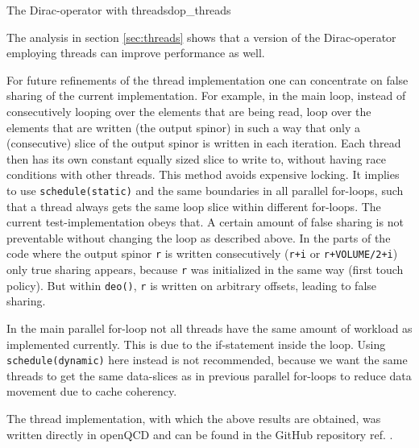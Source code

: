 \documentclass{article}
\theoremstyle{plain} %
\theoremstyle{convention} %
\theoremstyle{remark} %
\def\code#1{\texttt{#1}}
\numberwithin{equation}{section}
\begin{document}
\begin{proposal}{The Dirac-operator with threads}{dop_threads}

The analysis in section \ref{sec:threads} shows that a version of the Dirac-operator employing threads can improve performance as well.

For future refinements of the thread implementation one can concentrate on false sharing of the current implementation. For example, in the main loop, instead of consecutively looping over the elements that are being read, loop over the elements that are written (the output spinor) in such a way that only a (consecutive) slice of the output spinor is written in each iteration. Each thread then has its own constant equally sized slice to write to, without having race conditions with other threads. This method avoids expensive locking. It implies to use \code{schedule(static)} and the same boundaries in all parallel for-loops, such that a thread always gets the same loop slice within different for-loops. The current test-implementation obeys that. A certain amount of false sharing is not preventable without changing the loop as described above. In the parts of the code where the output spinor \code{r} is written consecutively (\code{r+i} or \code{r+VOLUME/2+i}) only true sharing appears, because \code{r} was initialized in the same way (first touch policy). But within \code{deo()}, \code{r} is written on arbitrary offsets, leading to false sharing.

In the main parallel for-loop not all threads have the same amount of workload as implemented currently. This is due to the if-statement inside the loop. Using \code{schedule(dynamic)} here instead is not recommended, because we want the same threads to get the same data-slices as in previous parallel for-loops to reduce data movement due to cache coherency.

The thread implementation, with which the above results are obtained, was written directly in openQCD and can be found in the GitHub repository ref. \cite{openqcd_threads}.

\end{proposal}
\end{document}

